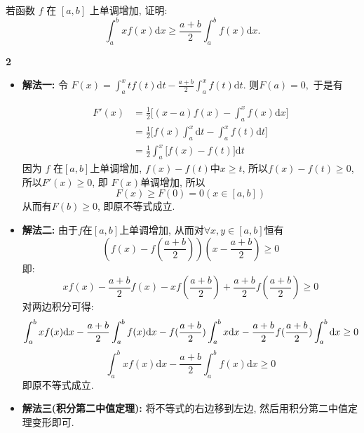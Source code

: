 \documentclass[12pt]{article}
\newenvironment{solution}[2][Solution]{\begin{trivlist}
\item[\hskip \labelsep {\bfseries #1}]}{\end{trivlist}}
\newenvironment{problem}[2][Problem]{\begin{trivlist}
\item[\hskip \labelsep {\bfseries #1}\hskip \labelsep {\bfseries #2.}]}{\end{trivlist}}
\begin{document}
\vspace{3cm}

\begin{problem}{2}
    若函数 $f$ 在 $\left[a, b\right]$ 上单调增加, 证明:
    \[
        \int_a^b xf(x) \mathrm{d} x \geq \frac{a+b}{2}\int_a^b f(x) \mathrm{d} x.
    \]
    
\end{problem}


\begin{solution}{2} \textbf{2}

    \begin{itemize}
        \item \textbf{解法一:} 令 $F(x) = \int_a^x tf(t)\mathrm{d}t - \frac{a+b}{2}\int_a^xf(t)\mathrm{d}t.$ 则$F(a) = 0,$ 于是有
        
            \[
                \begin{aligned}
                    F'(x) &= \frac{1}{2} \Big[ (x-a)f(x) - \int_a^x f(x)\mathrm{d}x \Big] \\
                    &= \frac{1}{2}\Big[ f(x)\int_a^x \mathrm{d}t - \int_a^x f(t)\mathrm{d}t \Big] \\
                    &= \frac{1}{2}\int_a^x \Big[f(x) - f(t)\Big]\mathrm{d}t
                \end{aligned}
            \]
            因为 $f$ 在$\left[a, b\right]$上单调增加, $f(x) - f(t)中x\geq t$, 所以$f(x) - f(t)\geq 0$, 所以$F'(x)\geq 0$, 即 $F(x)$单调增加, 所以
            \[
                F(x)\geq F(0) = 0(x\in \left[a, b\right])
            \]
            从而有$F(b)\geq 0$, 即原不等式成立.
        
        \item \textbf{解法二:} 由于$f$在$\left[a, b\right]$上单调增加, 从而对$\forall x, y \in \left[a, b\right]$恒有
            \[
                (f(x) - f(\frac{a+b}{2}))(x - \frac{a+b}{2}) \geq 0   
            \]
            即:
            \[
                xf(x) - \frac{a+b}{2}f(x) - xf(\frac{a+b}{2}) + \frac{a+b}{2}f(\frac{a+b}{2}) \geq 0
            \]
            对两边积分可得:
            \[
                \int_a^b xf(x)\mathrm{d}x - \frac{a+b}{2}\int_a^b f(x)\mathrm{d}x - f(\frac{a+b}{2})\int_a^b x\mathrm{d}x - \frac{a+b}{2}f(\frac{a+b}{2})\int_a^b \mathrm{d}x \geq 0\\
            \]
            \[
                \int_a^b xf(x)\mathrm{d}x - \frac{a+b}{2}\int_a^b f(x)\mathrm{d}x \geq 0    
            \]
            即原不等式成立.
        
        \item \textbf{解法三(积分第二中值定理):} 将不等式的右边移到左边, 然后用积分第二中值定理变形即可.
    \end{itemize}
    
\end{solution}
\end{document}
